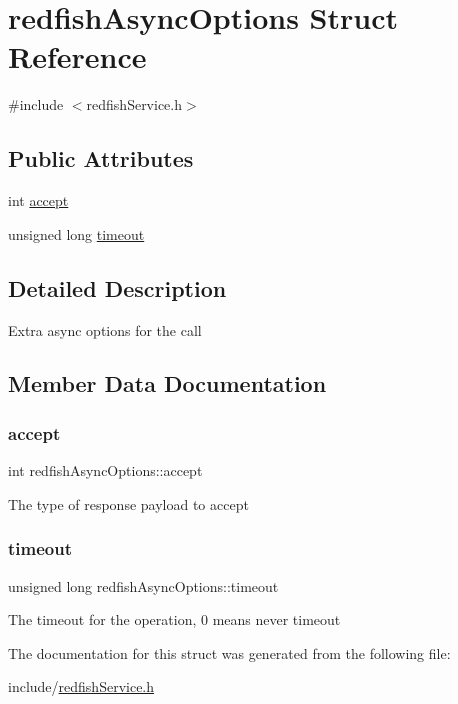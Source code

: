 \hypertarget{structredfishAsyncOptions}{}\section{redfish\+Async\+Options Struct Reference}
\label{structredfishAsyncOptions}


{\ttfamily \#include $<$redfish\+Service.\+h$>$}

\subsection*{Public Attributes}
\begin{DoxyCompactItemize}
\item 
int \hyperlink{structredfishAsyncOptions_aeabd60d828113c3e290caadf377d545a}{accept}
\item 
unsigned long \hyperlink{structredfishAsyncOptions_a4ef1a521e8f854dda76e0949dcef6071}{timeout}
\end{DoxyCompactItemize}


\subsection{Detailed Description}
Extra async options for the call 

\subsection{Member Data Documentation}
\mbox{\label{structredfishAsyncOptions_aeabd60d828113c3e290caadf377d545a}} 
\subsubsection{\texorpdfstring{accept}{accept}}
{\footnotesize\ttfamily int redfish\+Async\+Options\+::accept}

The type of response payload to accept \mbox{\label{structredfishAsyncOptions_a4ef1a521e8f854dda76e0949dcef6071}} 
\subsubsection{\texorpdfstring{timeout}{timeout}}
{\footnotesize\ttfamily unsigned long redfish\+Async\+Options\+::timeout}

The timeout for the operation, 0 means never timeout 

The documentation for this struct was generated from the following file\+:\begin{DoxyCompactItemize}
\item 
include/\hyperlink{redfishService_8h}{redfish\+Service.\+h}\end{DoxyCompactItemize}
